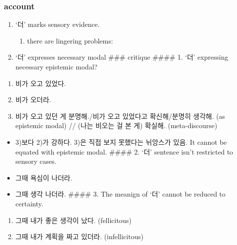 \hypertarget{account}{%
\subsubsection{account}\label{account}}

\begin{enumerate}
\def\labelenumi{\arabic{enumi}.}
\tightlist
\item
  `더' marks sensory evidence.

  \begin{enumerate}
  \def\labelenumii{\arabic{enumii}.}
  \tightlist
  \item
    there are lingering problems:
  \end{enumerate}
\item
  `더' expresses necessary modal \#\#\# critique \#\#\#\# 1. `더'
  expressing necessary epistemic modal?\\
\end{enumerate}

\begin{enumerate}
\def\labelenumi{\arabic{enumi})}
\tightlist
\item
  비가 오고 있었다.
\item
  비가 오더라.
\item
  비가 오고 있던 게 분명해./비가 오고 있었다고 확신해/분명히 생각해. (as
  epistemic modal) // (나는 비오는 걸 본 게) 확실해. (meta-discourse)
\end{enumerate}

\begin{itemize}
\tightlist
\item
  3)보다 2)가 강하다. 3)은 직접 보지 못했다는 뉘앙스가 있음. It cannot
  be equated with epistemic modal. \#\#\#\# 2. `더' sentence isn't
  restricted to sensory cases.
\item
  그때 욕심이 나더라.
\item
  그때 생각 나더라. \#\#\#\# 3. The meanign of `더' cannot be reduced to
  certainty.
\end{itemize}

\begin{enumerate}
\def\labelenumi{\arabic{enumi}.}
\tightlist
\item
  그때 내가 좋은 생각이 났다. (fellicitous)
\item
  그때 내가 계획을 짜고 있더라. (infellicitous)
\end{enumerate}

